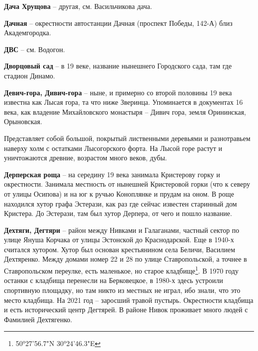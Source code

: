 \medskip

\textbf{Дача Хрущова} – другая, см. Васильчикова дача.\\

\medskip


\textbf{Дачная} – окрестности автостанции Дачная (проспект Победы, 142-А) близ Академгородка.\\

\medskip

\textbf{ДВС} – см. Водогон.\\

\medskip

\textbf{Дворцовый сад} – в 19 веке, название нынешнего Городского сада, там где стадион Динамо.\\

\medskip

\textbf{Девич-гора, Дивич-гора} – ныне, и примерно со второй половины 19 века известна как Лысая гора, та что ниже Зверинца. Упоминается в документах 16 века, как владение Михайловского монастыря – Дивич гора, земля Орининская, Орыновская.

Представляет собой большой, покрытый лиственными деревьями и разнотравьем наверху холм с остатками Лысогорского форта. На Лысой горе растут и уничтожаются древние, возрастом много веков, дубы.\\

\medskip

\textbf{Дерперская роща} – на середину 19 века занимала Кристерову горку и окрестности. Занимала местность от нынешней Кристеровой горки (что к северу от улицы Осипова) и на юг к ручью Коноплянке и прудам на оном. В роще находился хутор графа Эстерази, как раз где сейчас известен старинный дом Кристера. До Эстерази, там был хутор Дерпера, от чего и пошло название.\\

\medskip

\textbf{Дехтяги, Дегтяри} – район между Нивками и Галаганами, частный сектор по улице Януша Корчака от улицы Эстонской до Краснодарской. Еще в 1940-х считался хутором. Хутор был основан крестьянином села Беличи, Василием Дехтяренко. Между домами номер 22 и 28 по улице Ставропольской, а точнее в Ставропольском переулке, есть маленькое, но старое кладбище\footnote{50°27'56.7"N 30°24'46.3"E}. В 1970 году останки с кладбища перенесли на Берковецкое, в 1980-х здесь устроили спортивную площадку, но там никто из местных не играл, ибо знали, что это место кладбища. На 2021 год – заросший травой пустырь. Окрестности кладбища и есть исторический центр Дегтярей. В районе Нивок проживает много людей с Фамилией Дехтягенко.\\

